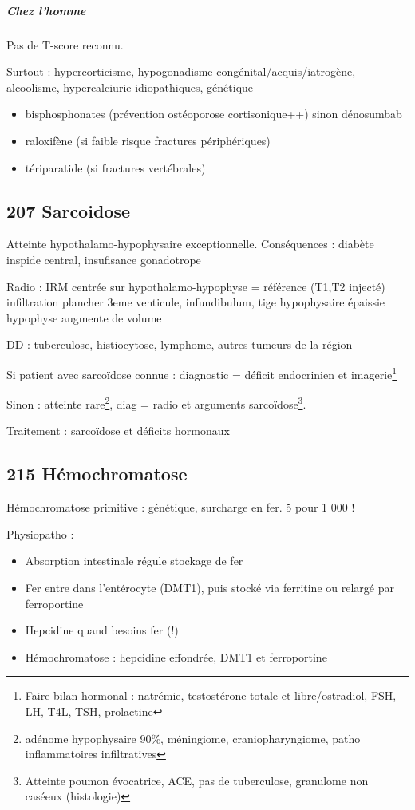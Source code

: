 \documentclass[11pt]{article}
\begin{document}
\subparagraph{Chez l'homme}
\label{sec:org9e67b92}
Pas de T-score reconnu. 

Surtout : hypercorticisme, hypogonadisme congénital/acquis/iatrogène, alcoolisme, hypercalciurie
idiopathiques, génétique

\begin{tcolorbox}
\begin{itemize}
\item bisphosphonates (prévention ostéoporose cortisonique++) sinon dénosumbab 
\item raloxifène (si faible risque fractures périphériques)
\item tériparatide (si  fractures vertébrales)
\end{itemize}
\end{tcolorbox}

\subsection{207 \textdagger{} Sarcoidose}
\label{sec:org6595110}
Atteinte hypothalamo-hypophysaire exceptionnelle. Conséquences : diabète
inspide central, insufisance gonadotrope

Radio : IRM centrée sur hypothalamo-hypophyse = référence (T1,T2 injecté) \thus
infiltration plancher 3eme venticule, infundibulum, tige hypophysaire épaissie
\textpm{} hypophyse augmente de volume

DD : tuberculose, histiocytose, lymphome, autres tumeurs de la région 

Si patient avec sarcoïdose connue : diagnostic = déficit endocrinien et imagerie\footnote{Faire bilan hormonal : natrémie, testostérone totale et libre/ostradiol,
FSH, LH, T4L, TSH, prolactine}

Sinon : atteinte rare\footnote{adénome hypophysaire 90\%, méningiome, craniopharyngiome, patho
inflammatoires infiltratives}, diag = radio et arguments sarcoïdose\footnote{Atteinte poumon évocatrice, \inc{} ACE, pas de tuberculose, granulome
non caséeux (histologie)}.

Traitement : sarcoïdose et déficits hormonaux

\subsection{215 \textdagger{} Hémochromatose}
\label{sec:org87ca206}
Hémochromatose primitive : génétique, surcharge en fer. 5 pour 1 000 !

Physiopatho : 
\begin{itemize}
\item Absorption intestinale régule stockage de fer
\item Fer entre dans l'entérocyte (DMT1), puis stocké via ferritine ou relargé par ferroportine
\item Hepcidine \dec quand besoins fer \inc (!)
\item Hémochromatose : hepcidine effondrée, DMT1 et ferroportine \inc
\end{itemize}
\end{document}
